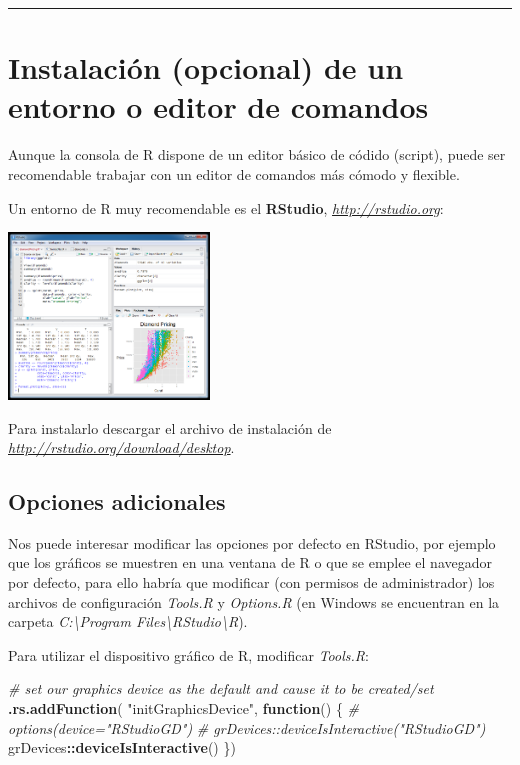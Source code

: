 \documentclass[
]{book}
\newenvironment{Shaded}{\begin{snugshade}}{\end{snugshade}}
\newcommand{\CommentTok}[1]{\textcolor[rgb]{0.56,0.35,0.01}{\textit{#1}}}
\newcommand{\ControlFlowTok}[1]{\textcolor[rgb]{0.13,0.29,0.53}{\textbf{#1}}}
\newcommand{\KeywordTok}[1]{\textcolor[rgb]{0.13,0.29,0.53}{\textbf{#1}}}
\newcommand{\NormalTok}[1]{#1}
\newcommand{\OperatorTok}[1]{\textcolor[rgb]{0.81,0.36,0.00}{\textbf{#1}}}
\newcommand{\StringTok}[1]{\textcolor[rgb]{0.31,0.60,0.02}{#1}}
\begin{document}
\begin{center}\rule{0.5\linewidth}{0.5pt}\end{center}

\hypertarget{instalaciuxf3n-opcional-de-un-entorno-o-editor-de-comandos}{%
\section{Instalación (opcional) de un entorno o editor de comandos}\label{instalaciuxf3n-opcional-de-un-entorno-o-editor-de-comandos}}

Aunque la consola de R dispone de un editor básico de códido (script),
puede ser recomendable trabajar con un editor de comandos más cómodo y
flexible.

Un entorno de R muy recomendable es el \textbf{RStudio},
\href{http://rstudio.org}{\emph{http://rstudio.org}}:

\includegraphics[width=0.4\textwidth,height=\textheight]{images/image8.png}

Para instalarlo descargar el archivo de instalación de
\href{http://rstudio.org/download/desktop}{\emph{http://rstudio.org/download/desktop}}.

\hypertarget{opciones-adicionales}{%
\subsection{Opciones adicionales}\label{opciones-adicionales}}

Nos puede interesar modificar las opciones por defecto en RStudio, por ejemplo que los gráficos se muestren en una ventana de R o que se emplee el navegador por defecto, para ello habría que modificar (con permisos de administrador) los archivos de configuración \emph{Tools.R} y \emph{Options.R}
(en Windows se encuentran en la carpeta \emph{C:\textbackslash Program Files\textbackslash RStudio\textbackslash R}).

Para utilizar el dispositivo gráfico de R, modificar \emph{Tools.R}:

\begin{Shaded}
\begin{Highlighting}[]
\CommentTok{# set our graphics device as the default and cause it to be created/set}
\KeywordTok{.rs.addFunction}\NormalTok{( }\StringTok{"initGraphicsDevice"}\NormalTok{, }\ControlFlowTok{function}\NormalTok{()}
\NormalTok{\{}
   \CommentTok{# options(device="RStudioGD")}
   \CommentTok{# grDevices::deviceIsInteractive("RStudioGD")}
\NormalTok{  grDevices}\OperatorTok{::}\KeywordTok{deviceIsInteractive}\NormalTok{()}
\NormalTok{\})}
\end{Highlighting}
\end{Shaded}
\end{document}
